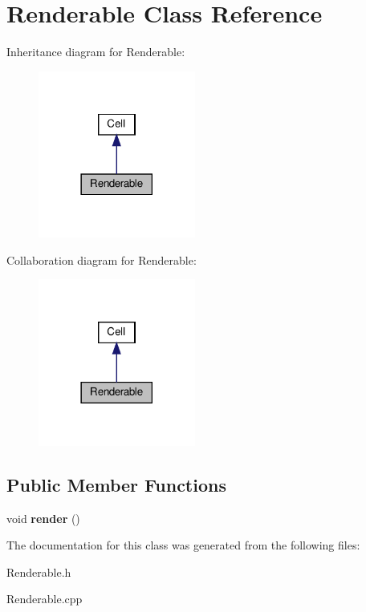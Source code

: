 \hypertarget{classRenderable}{}\section{Renderable Class Reference}
\label{classRenderable}


Inheritance diagram for Renderable\+:
\nopagebreak
\begin{figure}[H]
\begin{center}
\leavevmode
\includegraphics[width=146pt]{classRenderable__inherit__graph}
\end{center}
\end{figure}


Collaboration diagram for Renderable\+:
\nopagebreak
\begin{figure}[H]
\begin{center}
\leavevmode
\includegraphics[width=146pt]{classRenderable__coll__graph}
\end{center}
\end{figure}
\subsection*{Public Member Functions}
\begin{DoxyCompactItemize}
\item 
\mbox{\label{classRenderable_a1dce45c4703b60fd30acf824c77df9b6}} 
void {\bfseries render} ()
\end{DoxyCompactItemize}


The documentation for this class was generated from the following files\+:\begin{DoxyCompactItemize}
\item 
Renderable.\+h\item 
Renderable.\+cpp\end{DoxyCompactItemize}

